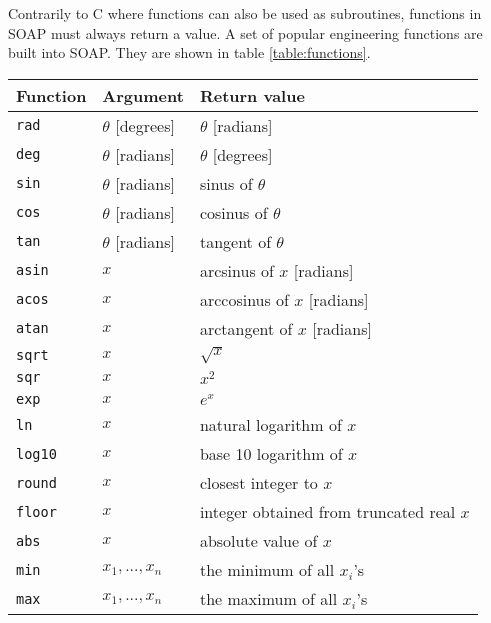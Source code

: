 \documentclass{warpdoc}
\renewcommand{\fontsizetable}{\footnotesize\scalefont{1.0}}
\begin{document}
Contrarily to C where functions
can also be used as subroutines, functions in SOAP must always return a value.
A set of popular engineering functions are built into SOAP. They
are shown in table \ref{table:functions}.
%
\begin{table}[ht]
\fontsizetable
\vspace{0.3cm}
\begin{center}
  \begin{threeparttable}
    \begin{tabular}{ll p{6.5cm}}
      \toprule
        Function & Argument               & Return value\\
      \midrule
        \verb|rad|   & $\theta$ [degrees] & $\theta$ [radians]\\
        \verb|deg|   & $\theta$ [radians] & $\theta$ [degrees]\\
        \verb|sin|   & $\theta$ [radians] & sinus of $\theta$\\
        \verb|cos|   & $\theta$ [radians] & cosinus of $\theta$\\
        \verb|tan|   & $\theta$ [radians] & tangent of $\theta$\\
        \verb|asin|  & $x$                & arcsinus of $x$ [radians]\\
        \verb|acos|  & $x$                & arccosinus of $x$ [radians]\\
        \verb|atan|  & $x$                & arctangent of $x$ [radians]\\
        \verb|sqrt|  & $x$                & $\sqrt{x}$ \\
        \verb|sqr|   & $x$                & $x^2$\\
        \verb|exp|   & $x$                & $e^x$ \\
        \verb|ln|    & $x$                & natural logarithm of $x$ \\
        \verb|log10|    & $x$                & base 10 logarithm of $x$ \\
        \verb|round| & $x$                & closest integer to $x$ \\
        \verb|floor| & $x$                & integer obtained from truncated real $x$ \\
        \verb|abs|   & $x$                & absolute value of $x$ \\
        \verb|min|   & $x_1,...,x_n$      & the minimum of all $x_i$'s \\
        \verb|max|   & $x_1,...,x_n$      & the maximum of all $x_i$'s \\

\end{tabular}
\end{threeparttable}
\end{center}
\end{table}
\end{document}
